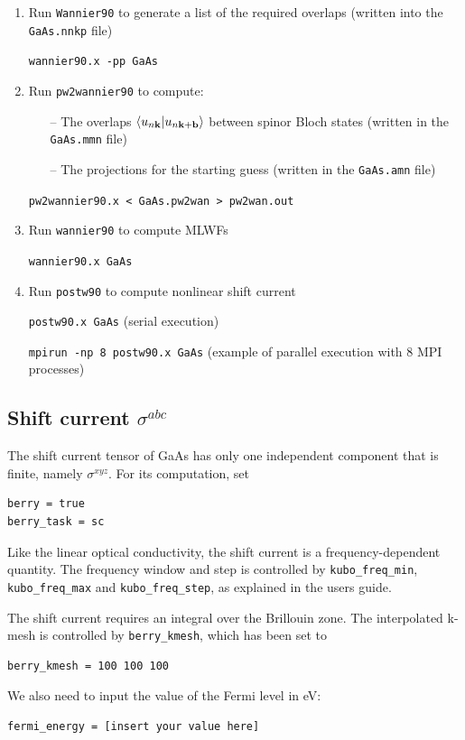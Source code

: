 \documentclass[a4paper,11pt,twoside]{article}
\begin{document}
\begin{itemize}
\begin{enumerate}
\item Run {\tt Wannier90} to generate a list of the required overlaps (written into the \verb|GaAs.nnkp| file)

\verb|wannier90.x -pp GaAs|


\item Run {\tt pw2wannier90} to compute:

\begin{itemize}
\item[--] The overlaps $\langle u_{n\bf{k}}|u_{n\bf{k+b}}\rangle$ between spinor 
Bloch states (written in the \verb|GaAs.mmn| file) 
\item[--] The projections for the starting guess (written in the \verb|GaAs.amn| file)

\end{itemize}


\verb|pw2wannier90.x < GaAs.pw2wan > pw2wan.out|

\item Run {\tt wannier90} to  compute MLWFs

\verb|wannier90.x GaAs|

\item Run {\tt postw90} to compute nonlinear shift current

\verb|postw90.x GaAs| (serial execution)

\verb|mpirun -np 8 postw90.x GaAs| (example of parallel execution with 8 MPI processes)

\end{enumerate}




\end{itemize}


\subsection*{Shift current $\sigma^{abc}$}

The shift current tensor of GaAs has only one independent component that is finite, namely $\sigma^{xyz}$. 
For its computation, set
\begin{verbatim}
berry = true
berry_task = sc
\end{verbatim}
Like the linear optical conductivity, the shift current is a frequency-dependent quantity. 
The frequency window and step is controlled by \verb|kubo_freq_min|, \verb|kubo_freq_max| and 
\verb|kubo_freq_step|, as explained in the users guide. 

The shift current requires an integral over the Brillouin zone. The interpolated k-mesh is controlled by \verb|berry_kmesh|,
which has been set to 
\begin{verbatim}
berry_kmesh = 100 100 100
 \end{verbatim}
We also need to input the value of the Fermi level in eV:
\begin{verbatim}
fermi_energy = [insert your value here]
\end{verbatim}
\end{document}
